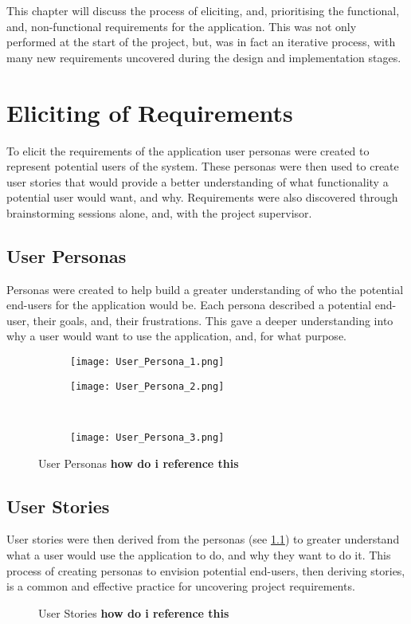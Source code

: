 This chapter will discuss the process of eliciting, and, prioritising the functional, and, non-functional requirements for the application. This was not only performed at the start of the project, but, was in fact an iterative process, with many new requirements uncovered during the design and implementation stages.
\section{Eliciting of Requirements}
To elicit the requirements of the application user personas were created to represent potential users of the system. These personas were then used to create user stories that would provide a better understanding of what functionality a potential user would want, and why. Requirements were also discovered through brainstorming sessions alone, and, with the project supervisor.
\subsection{User Personas} \label{personas}
Personas were created to help build a greater understanding of who the potential end-users for the application would be. Each persona described a potential end-user, their goals, and, their frustrations. This gave a deeper understanding into why a user would want to use the application, and, for what purpose.
\begin{figure}[!htbp]
    \centering
    \begin{subfigure}[b]{0.45\textwidth}
        \texttt{[image: User\_Persona\_1.png]}
    \end{subfigure}
    \hspace{0.5em}
    \begin{subfigure}[b]{0.45\textwidth}
        \texttt{[image: User\_Persona\_2.png]}
    \end{subfigure}
    \\[0.5ex]
    \begin{subfigure}[b]{0.45\textwidth}
        \texttt{[image: User\_Persona\_3.png]}
    \end{subfigure}
    \caption{User Personas \textbf{how do i reference this}}
    \label{fig:personas}
\end{figure}
\FloatBarrier
\subsection{User Stories}
User stories were then derived from the personas (see \ref{personas}) to greater understand what a user would use the application to do, and why they want to do it. This process of creating personas to envision potential end-users, then deriving stories, is a common and effective practice for uncovering project requirements. 
\begin{figure}[!htbp]
    \centering
    \begin{subfigure}[b]{0.90\textwidth}
    \end{subfigure}
    \caption{User Stories \textbf{how do i reference this}}
    \label{fig:stories}
\end{figure}
\FloatBarrier
